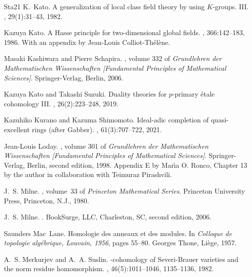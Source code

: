 \documentclass{amsart}
\theoremstyle{remark}
\numberwithin{equation}{subsection}
\begin{document}
\begin{thebibliography}{{Sta}21}
K.~Kato.
\newblock A generalization of local class field theory by using {$K$}-groups.
  {III}.
, 29(1):31--43, 1982.

Kazuya Kato.
\newblock A {H}asse principle for two-dimensional global fields.
, 366:142--183, 1986.
\newblock With an appendix by Jean-Louis Colliot-Th\'{e}l\`ene.

Masaki Kashiwara and Pierre Schapira.
, volume 332 of {\em Grundlehren der
  Mathematischen Wissenschaften [Fundamental Principles of Mathematical
  Sciences]}.
\newblock Springer-Verlag, Berlin, 2006.

Kazuya Kato and Takashi Suzuki.
\newblock Duality theories for {$p$}-primary \'{e}tale cohomology {III}.
, 26(2):223--248, 2019.

Kazuhiko Kurano and Kazuma Shimomoto.
\newblock Ideal-adic completion of quasi-excellent rings (after {G}abber).
, 61(3):707--722, 2021.

Jean-Louis Loday.
, volume 301 of {\em Grundlehren der
  Mathematischen Wissenschaften [Fundamental Principles of Mathematical
  Sciences]}.
\newblock Springer-Verlag, Berlin, second edition, 1998.
\newblock Appendix E by Mar\'{\i}a O. Ronco, Chapter 13 by the author in
  collaboration with Teimuraz Pirashvili.

J.~S. Milne.
, volume~33 of {\em Princeton Mathematical
  Series}.
\newblock Princeton University Press, Princeton, N.J., 1980.

J.~S. Milne.
.
\newblock BookSurge, LLC, Charleston, SC, second edition, 2006.

Saunders Mac~Lane.
\newblock Homologie des anneaux et des modules.
\newblock In {\em Colloque de topologie alg\'ebrique, {L}ouvain, 1956}, pages
  55--80. Georges Thone, Li\`ege, 1957.

A.~S. Merkurjev and A.~A. Suslin.
-cohomology of {S}everi-{B}rauer varieties and the norm residue
  homomorphism.
, 46(5):1011--1046, 1135--1136,
  1982.


\end{thebibliography}
\end{document}
